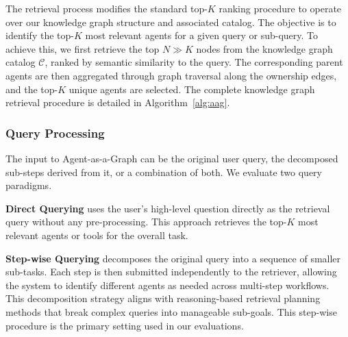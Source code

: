 \documentclass[a4paper,twoside]{article}
\begin{document}
The retrieval process modifies the standard top-\(K\) ranking procedure to operate over our knowledge graph structure and associated catalog. The objective is to identify the top-\(K\) most relevant agents for a given query or sub-query. To achieve this, we first retrieve the top \(N \gg K\) nodes from the knowledge graph catalog \(\mathcal{C}\), ranked by semantic similarity to the query. The corresponding parent agents are then aggregated through graph traversal along the ownership edges, and the top-\(K\) unique agents are selected. The complete knowledge graph retrieval procedure is detailed in Algorithm~\ref{alg:aag}.

\subsubsection{Query Processing}

The input to Agent-as-a-Graph can be the original user query, the decomposed sub-steps derived from it, or a combination of both. We evaluate two query paradigms.

\textbf{Direct Querying} uses the user's high-level question directly as the retrieval query without any pre-processing. This approach retrieves the top-\(K\) most relevant agents or tools for the overall task.

\textbf{Step-wise Querying} decomposes the original query into a sequence of smaller sub-tasks. Each step is then submitted independently to the retriever, allowing the system to identify different agents as needed across multi-step workflows. This decomposition strategy aligns with reasoning-based retrieval planning methods that break complex queries into manageable sub-goals. This step-wise procedure is the primary setting used in our evaluations.
\end{document}
